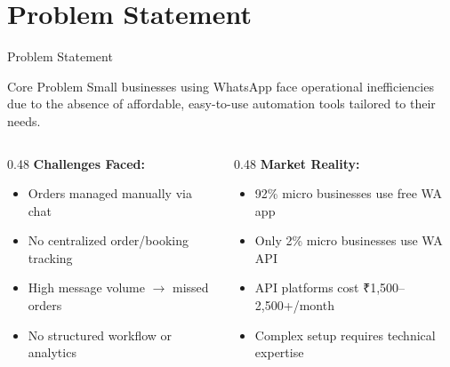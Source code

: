 \documentclass[aspectratio=169]{beamer}
\begin{document}
\section{Problem Statement}
\begin{frame}[shrink=5]{Problem Statement}

\begin{block}{Core Problem}
Small businesses using WhatsApp face operational inefficiencies due to the absence of affordable, easy-to-use automation tools tailored to their needs.
\end{block}

\vspace{0.3cm}
\begin{columns}[T]
\begin{column}{0.48\textwidth}
\textbf{Challenges Faced:}
\begin{itemize}
  \item Orders managed manually via chat
  \item No centralized order/booking tracking
  \item High message volume $\rightarrow$ missed orders
  \item No structured workflow or analytics
\end{itemize}
\end{column}
\begin{column}{0.48\textwidth}
\textbf{Market Reality:}
\begin{itemize}
  \item 92\% micro businesses use free WA app
  \item Only 2\% micro businesses use WA API
  \item API platforms cost \textrm{₹}1,500--2,500+/month
  \item Complex setup requires technical expertise
\end{itemize}
\end{column}
\end{columns}

\end{frame}

\end{document}
